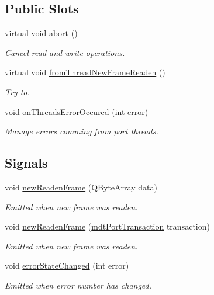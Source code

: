 \subsection*{Public Slots}
\begin{DoxyCompactItemize}
\item 
virtual void \hyperlink{classmdt_port_manager_a1d185e9bb610aee16ccd9499ae7bff0d}{abort} ()
\begin{DoxyCompactList}\small\item\em Cancel read and write operations. \end{DoxyCompactList}\item 
virtual void \hyperlink{classmdt_port_manager_a4fcc8f0699b655156e661bb3de6056cc}{fromThreadNewFrameReaden} ()
\begin{DoxyCompactList}\small\item\em Try to. \end{DoxyCompactList}\item 
void \hyperlink{classmdt_port_manager_a7e45b8e3475e5182ed12218616664d07}{onThreadsErrorOccured} (int error)
\begin{DoxyCompactList}\small\item\em Manage errors comming from port threads. \end{DoxyCompactList}\end{DoxyCompactItemize}
\subsection*{Signals}
\begin{DoxyCompactItemize}
\item 
void \hyperlink{classmdt_port_manager_a77ef4a432306638f5b0f91df7863ac62}{newReadenFrame} (QByteArray data)
\begin{DoxyCompactList}\small\item\em Emitted when new frame was readen. \end{DoxyCompactList}\item 
void \hyperlink{classmdt_port_manager_a915ff3372cccd5f412b828cc81a3381f}{newReadenFrame} (\hyperlink{classmdt_port_transaction}{mdtPortTransaction} transaction)
\begin{DoxyCompactList}\small\item\em Emitted when new frame was readen. \end{DoxyCompactList}\item 
\hypertarget{classmdt_port_manager_a053ba62f090eced0cf635c9be5c6b052}{
void \hyperlink{classmdt_port_manager_a053ba62f090eced0cf635c9be5c6b052}{errorStateChanged} (int error)}
\label{classmdt_port_manager_a053ba62f090eced0cf635c9be5c6b052}

\begin{DoxyCompactList}\small\item\em Emitted when error number has changed. \end{DoxyCompactList}\end{DoxyCompactItemize}
